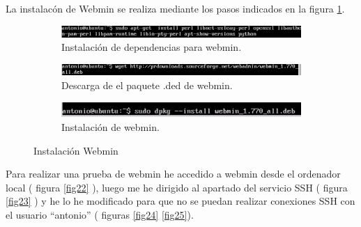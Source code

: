 La instalacón de Webmin se realiza mediante los pasos indicados en la figura \ref{fig21}. \cite{webmin}
\begin{figure}[H]
    \centering
    \begin{subfigure}[b]{1\textwidth}
        \includegraphics[width=\textwidth]{imagenes/img22}
        \caption{Instalación de dependencias para webmin.}
    \end{subfigure}
    
        \begin{subfigure}[b]{1\textwidth}
        \includegraphics[width=\textwidth]{imagenes/img23}
        \caption{Descarga de el paquete .ded de webmin.}
    \end{subfigure}
    
        \begin{subfigure}[b]{1\textwidth}
        \includegraphics[width=\textwidth]{imagenes/img24}
        \caption{Instalación de webmin.}
    \end{subfigure}
    \caption{Instalación Webmin}
     \label{fig21} 
\end{figure}

Para realizar una prueba de webmin he accedido a webmin desde el ordenador local ( figura \ref{fig22} ), luego me he dirigido al apartado del servicio SSH ( figura \ref{fig23} ) y he lo he modificado para que no se puedan realizar conexiones SSH con el usuario ``antonio'' ( figuras \ref{fig24} \ref{fig25}).



